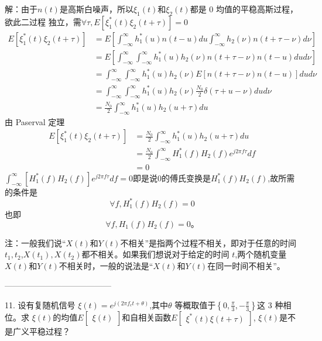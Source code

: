 \documentclass[utf8]{article}
\begin{document}
解：由于$n(t)$是高斯白噪声，所以$\xi_1(t)$和$\xi_2(t)$都是 0 均值的平稳高斯过程，欲此二过程
独立，需$\forall\tau,E\left[\xi_1^*\left(t\right)\xi_2\left(t+\tau\right)\right]=0$
$$\begin{aligned}E\left[\xi_1^*\left(t\right)\xi_2\left(t+\tau\right)\right]&=E\left[\int_{-\infty}^\infty h_1^*\left(u\right)n\left(t-u\right)du\int_{-\infty}^\infty h_2\left(\nu\right)n\left(t+\tau-\nu\right)d\nu\right]\\&=E\left[\int_{-\infty}^\infty\int_{-\infty}^\infty h_1^*\left(u\right)h_2\left(\nu\right)n\left(t+\tau-\nu\right)n\left(t-u\right)dud\nu\right]\\&=\int_{-\infty}^\infty\int_{-\infty}^\infty h_1^*\left(u\right)h_2\left(\nu\right)E\left[n\left(t+\tau-\nu\right)n\left(t-u\right)\right]dud\nu\\&=\int_{-\infty}^\infty\int_{-\infty}^\infty h_1^*\left(u\right)h_2\left(\nu\right)\frac{N_0}2\delta\left(\tau+u-\nu\right)dud\nu\\&=\frac{N_0}2\int_{-\infty}^\infty h_1^*\left(u\right)h_2\left(u+\tau\right)du\end{aligned}$$
由 Paserval 定理
$$\begin{aligned}E\left[\xi_1^*\left(t\right)\xi_2\left(t+\tau\right)\right]&=\frac{N_0}2\int_{-\infty}^\infty h_1^*\left(u\right)h_2\left(u+\tau\right)du\\&=\frac{N_0}2\int_{-\infty}^\infty H_1^*\left(f\right)H_2\left(f\right)e^{j2\pi f\tau}df\\&=0\end{aligned}$$
$\int_{-\infty}^{\infty}[H_1^*(f)H_2(f)]e^{j2\pi f\tau}df=0$即是说0的傅氏变换是$H_1^*(f)H_2(f)$,故所需的条件是
$$\forall f,H_1^*\left(f\right)H_2\left(f\right)=0$$
也即
$$\forall f,H_1\left(f\right)H_2\left(f\right)=0。$$

注：一般我们说“$X(t)$和$Y(t)$不相关”是指两个过程不相关，即对于任意的时间$t_1,t_2$,$X(t_1),X(t_2)$都不相关。如果我们想说对于给定的时间 $t$,两个随机变量$X(t)$和$Y(t)$不相关时，一般的说法是“$X(t)$和$Y(t)$在同一时间不相关”。

---------------------------------------

11. 设有复随机信号 $\xi(t)=e^{j(2\pi f_ct+\theta)}$,其中$\theta$ 等概取值于$\left\{0,\frac\pi3,-\frac\pi3\right\}$这 3 种相位。求 $\xi(t)$的均值$E\begin{bmatrix}\xi(t)\end{bmatrix}$和自相关函数$E\begin{bmatrix} \xi ^* ( t) \xi ( t+ \tau ) \end{bmatrix}$, $\xi ( t)$是不是广义平稳过程？
\end{document}
